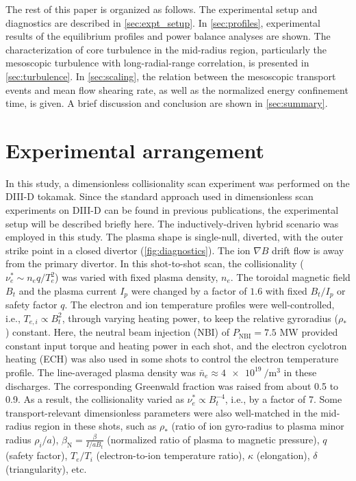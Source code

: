 \documentclass[english,aip,pop,superscriptaddress,preprint,letterpaper]{revtex4-2}
\begin{document}
The rest of this paper is organized as follows.
The experimental setup and diagnostics are described in \cref{sec:expt_setup}.
In \cref{sec:profiles}, experimental results of the equilibrium profiles and power balance analyses are shown.
The characterization of core turbulence in the mid-radius region, particularly the mesoscopic turbulence with long-radial-range correlation, is presented in \cref{sec:turbulence}.
In \cref{sec:scaling}, the relation between the mesoscopic transport events and mean flow shearing rate, as well as the normalized energy confinement time, is given.
A brief discussion and conclusion are shown in \cref{sec:summary}.

\section{Experimental arrangement\label{sec:expt_setup}}

In this study, a dimensionless collisionality scan experiment was performed on the DIII-D tokamak.\cite{luxonDesignRetrospectiveDIIID2002}
Since the standard approach used in dimensionless scan experiments on DIII-D can be found in previous publications,\cite{pettyScalingHeatTransport1999} the experimental setup will be described briefly here.
The inductively-driven hybrid scenario was employed in this study.\cite{pettyHighbetaSteadystateHybrid2015}
The plasma shape is single-null, diverted, with the outer strike point in a closed divertor (\cref{fig:diagnostics}).
The ion $\nabla B$ drift flow is away from the primary divertor.
In this shot-to-shot scan, the collisionality ($\nu_{e}^{*}\sim n_{e}q/T_{e}^{2}$) was varied with fixed plasma density, $n_{e}$.
The toroidal magnetic field $B_{t}$ and the plasma current $I_{p}$ were changed by a factor of $1.6$ with fixed $B_{t}/I_{p}$ or safety factor \(q\).
The electron and ion temperature profiles were well-controlled, i.e., $T_{e,i}\propto B_{t}^{2}$, through varying heating power, to keep the relative gyroradius (\(\rho_*\)) constant.
Here, the neutral beam injection (NBI) of $P_{\mathrm{NBI}}=7.5$ MW provided constant input torque and heating power in each shot, and the electron cyclotron heating (ECH) was also used in some shots to control the electron temperature profile.
The line-averaged plasma density was $\bar{n}_{e}\approx\SI{4e19}{\per\cubic\meter}$ in these discharges.
The corresponding Greenwald fraction was raised from about 0.5 to 0.9.
As a result, the collisionality varied as $\nu_{e}^{*} \propto B_{t}^{-4}$, i.e., by a factor of 7.
Some transport-relevant dimensionless parameters were also well-matched in the mid-radius region in these shots, such as $\rho_{*}$ (ratio of ion gyro-radius to plasma minor radius $\rho_{i}/a$), $\beta_\mathrm{N}=\frac{\beta}{I/aB_{t}}$ (normalized ratio of plasma to magnetic pressure), $q$ (safety factor), $T_{e}/T_{i}$ (electron-to-ion temperature ratio), $\kappa$ (elongation), $\delta$ (triangularity), etc.
\end{document}
